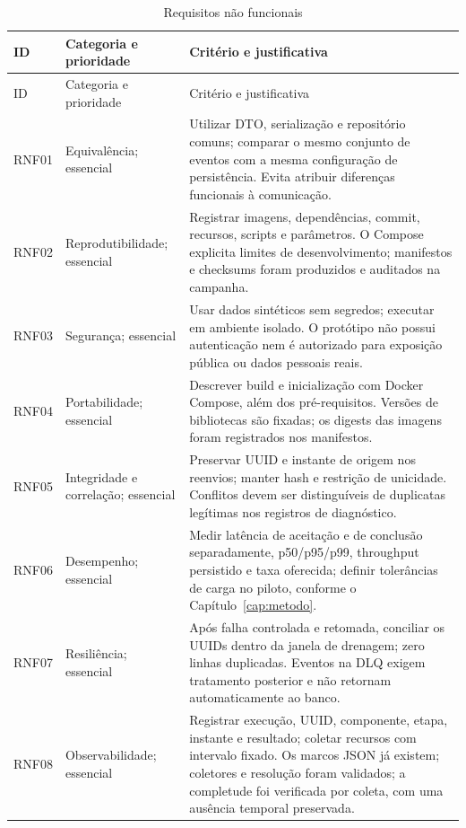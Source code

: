 {\small
\begin{longtable}{>{\raggedright\arraybackslash}p{}>{\raggedright\arraybackslash}p{}>{\raggedright\arraybackslash}p{}}
\caption{Requisitos não funcionais}\label{tab:rnf}\\
\hline ID & Categoria e prioridade & Critério e justificativa\\ \hline
\endfirsthead
\hline ID & Categoria e prioridade & Critério e justificativa\\ \hline
\endhead
RNF01 & Equivalência; essencial & Utilizar DTO, serialização e repositório comuns; comparar o mesmo conjunto de eventos com a mesma configuração de persistência. Evita atribuir diferenças funcionais à comunicação.\\ \hline
RNF02 & Reprodutibilidade; essencial & Registrar imagens, dependências, commit, recursos, scripts e parâmetros. O Compose explicita limites de desenvolvimento; manifestos e checksums foram produzidos e auditados na campanha.\\ \hline
RNF03 & Segurança; essencial & Usar dados sintéticos sem segredos; executar em ambiente isolado. O protótipo não possui autenticação nem é autorizado para exposição pública ou dados pessoais reais.\\ \hline
RNF04 & Portabilidade; essencial & Descrever build e inicialização com Docker Compose, além dos pré-requisitos. Versões de bibliotecas são fixadas; os digests das imagens foram registrados nos manifestos.\\ \hline
RNF05 & Integridade e correlação; essencial & Preservar UUID e instante de origem nos reenvios; manter hash e restrição de unicidade. Conflitos devem ser distinguíveis de duplicatas legítimas nos registros de diagnóstico.\\ \hline
RNF06 & Desempenho; essencial & Medir latência de aceitação e de conclusão separadamente, p50/p95/p99, throughput persistido e taxa oferecida; definir tolerâncias de carga no piloto, conforme o Capítulo~\ref{cap:metodo}.\\ \hline
RNF07 & Resiliência; essencial & Após falha controlada e retomada, conciliar os UUIDs dentro da janela de drenagem; zero linhas duplicadas. Eventos na DLQ exigem tratamento posterior e não retornam automaticamente ao banco.\\ \hline
RNF08 & Observabilidade; essencial & Registrar execução, UUID, componente, etapa, instante e resultado; coletar recursos com intervalo fixado. Os marcos JSON já existem; coletores e resolução foram validados; a completude foi verificada por coleta, com uma ausência temporal preservada.\\ \hline

\end{longtable}}
